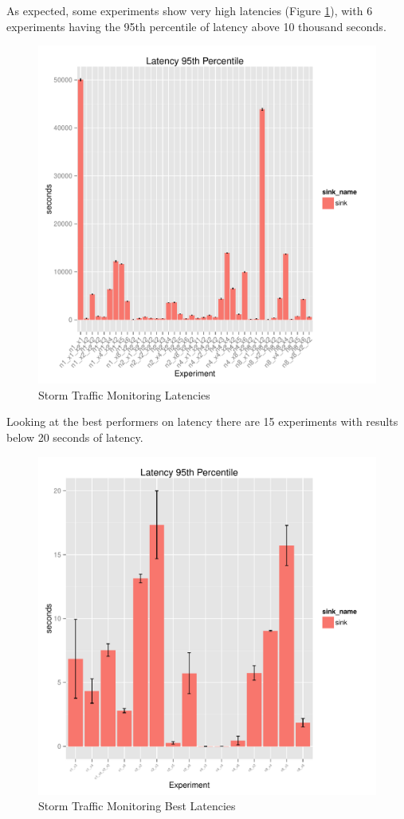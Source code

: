 \documentclass[ppgc,diss,english]{iiufrgs}
\begin{document}
As expected, some experiments show very high latencies (Figure \ref{fig:storm_trafficmonitoring_latency}), with 6 experiments having the 95th percentile of latency above 10 thousand seconds.

\begin{figure}[H]
    \centering
	\includegraphics[width=.6\textwidth]{summaries/storm_trafficmonitoring/full_latency.pdf}
	\caption{Storm Traffic Monitoring Latencies}
	\label{fig:storm_trafficmonitoring_latency}
\end{figure}

Looking at the best performers on latency there are 15 experiments with results below 20 seconds of latency.

\begin{figure}[H]
    \centering
	\includegraphics[width=.6\textwidth]{summaries/storm_trafficmonitoring/best_latency.pdf}
	\caption{Storm Traffic Monitoring Best Latencies}
	\label{fig:storm_trafficmonitoring_latency_best}
\end{figure}
\end{document}
